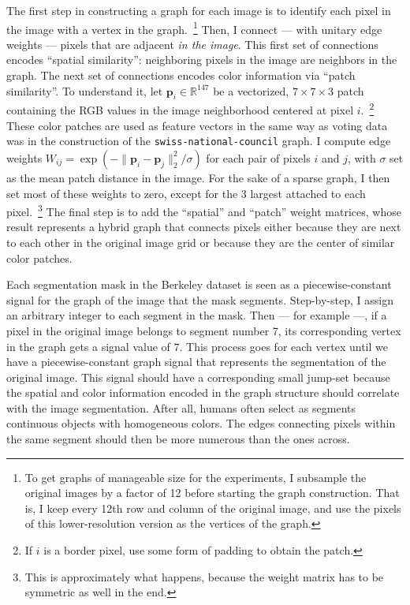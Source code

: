 The first step in constructing a graph for each image is to identify each pixel in the image with a vertex in the graph.~\footnote{To get graphs of manageable size for the experiments, I subsample the original images by a factor of 12 before starting the graph construction. That is, I keep every 12th row and column of the original image, and use the pixels of this lower-resolution version as the vertices of the graph.} Then, I connect --- with unitary edge weights --- pixels that are adjacent \emph{in the image}. This first set of connections encodes ``spatial similarity'': neighboring pixels in the image are neighbors in the graph. The next set of connections encodes color information via ``patch similarity''. To understand it, let $\mathbf{p}_i \in \mathbb{R}^{147}$ be a vectorized, $7 \times 7 \times 3$ patch containing the RGB values in the image neighborhood centered at pixel $i$.~\footnote{If $i$ is a border pixel, use some form of padding to obtain the patch.} These color patches are used as feature vectors in the same way as voting data was in the construction of the \texttt{swiss-national-council} graph. I compute edge weights $W_{ij} = \exp \left ( -\| \mathbf{p}_i - \mathbf{p}_j \|_2^2 / \sigma \right )$ for each pair of pixels $i$ and $j$, with $\sigma$ set as the mean patch distance in the image. For the sake of a sparse graph, I then set most of these weights to zero, except for the 3 largest attached to each pixel.~\footnote{This is approximately what happens, because the weight matrix has to be symmetric as well in the end.} The final step is to add the ``spatial'' and ``patch'' weight matrices, whose result represents a hybrid graph that connects pixels either because they are next to each other in the original image grid or because they are the center of similar color patches.

Each segmentation mask in the Berkeley dataset is seen as a piecewise-constant signal for the graph of the image that the mask segments. Step-by-step, I assign an arbitrary integer to each segment in the mask. Then --- for example ---, if a pixel in the original image belongs to segment number 7, its corresponding vertex in the graph gets a signal value of $7$. This process goes for each vertex until we have a piecewise-constant graph signal that represents the segmentation of the original image. This signal should have a corresponding small jump-set because the spatial and color information encoded in the graph structure should correlate with the image segmentation. After all, humans often select as segments continuous objects with homogeneous colors. The edges connecting pixels within the same segment should then be more numerous than the ones across.

